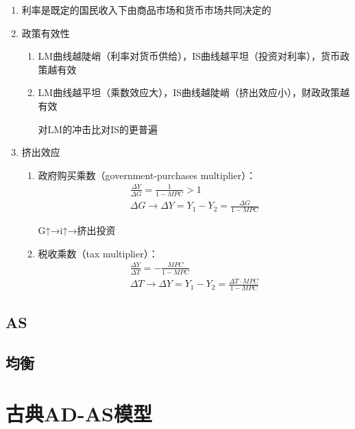 \documentclass[12pt]{book}
\begin{document}
\begin{enumerate}[1.]
    \item 利率是既定的国民收入下由商品市场和货币市场共同决定的
    \item 政策有效性
          \begin{enumerate}[(1)]
              \item LM曲线越陡峭（利率对货币供给），IS曲线越平坦（投资对利率），货币政策越有效
              \item LM曲线越平坦（乘数效应大），IS曲线越陡峭（挤出效应小），财政政策越有效
                    \par 对LM的冲击比对IS的更普遍
          \end{enumerate}
    \item 挤出效应
          \begin{enumerate}[(1)]
              \item 政府购买乘数（government-purchases multiplier）：
                    \begin{gather*}
                        \frac{\Delta Y}{\Delta G}=\frac{1}{1-MPC}>1 \\
                        \Delta G\rightarrow \Delta Y=Y_1-Y_2=\frac{\Delta G}{1-MPC}
                    \end{gather*}
                    \par G↑→i↑→挤出投资
              \item 税收乘数（tax multiplier）：
                    \begin{gather*}
                        \frac{\Delta Y}{\Delta T}=-\frac{MPC}{1-MPC} \\
                        ΔT\rightarrow \Delta Y=Y_1-Y_2=\frac{\Delta T·MPC}{1-MPC}
                    \end{gather*}
          \end{enumerate}
\end{enumerate}




\section{AS}



\section{均衡}



\chapter{古典AD-AS模型}
\end{document}
